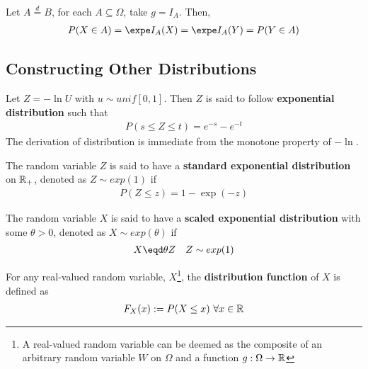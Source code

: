 \documentclass{article}
\begin{document}
   	\begin{corollary}
   		Let $A \overset{d}{=} B$, for each $A \subseteq \Omega$, take $g = I_A$. Then,
	   	\begin{align}
	   		P(X \in A) = \expe I_A(X) = \expe I_A(Y) = P(Y \in A)
	   	\end{align}
   	\end{corollary}
   	
   	\subsection{Constructing Other Distributions}
   	
   	\begin{definition}
   		Let $Z = - \ln U$ with $u \sim unif[0,1]$. Then $Z$ is said to follow \textbf{exponential distribution} such that
   		\begin{align}
   			P(s \leq Z \leq t) = e^{-s} - e^{-t}
   		\end{align}
   		The derivation of distribution is immediate from the monotone property of $-\ln$.
   	\end{definition}
   	
   	\begin{definition}
   		The random variable $Z$ is said to have a \textbf{standard exponential distribution} on $\mathbb{R}_+$, denoted as $Z \sim exp(1)$ if
   		\begin{align}
   			P(Z \leq z) = 1 - \exp(-z)
   		\end{align}
   	\end{definition}
   	
   	\begin{definition}
   		The random variable $X$ is said to have a \textbf{scaled exponential distribution} with some $\theta > 0$, denoted as $X \sim exp(\theta)$ if
   		\begin{align}
   			X \eqd \theta Z\quad Z \sim exp(1)
   		\end{align}
   	\end{definition}
   	
   	\begin{definition}
   		For any real-valued random variable, $X$\footnote{A real-valued random variable can be deemed as the composite of an arbitrary random variable $W$ on $\Omega$ and a function $g: \Omega \to \mathbb{R}$}, the \textbf{distribution function} of $X$ is defined as
   		\begin{align}
   			F_X(x) := P(X \leq x)\ \forall x \in \mathbb{R}
   		\end{align}
   	\end{definition}
   	
\end{document}
